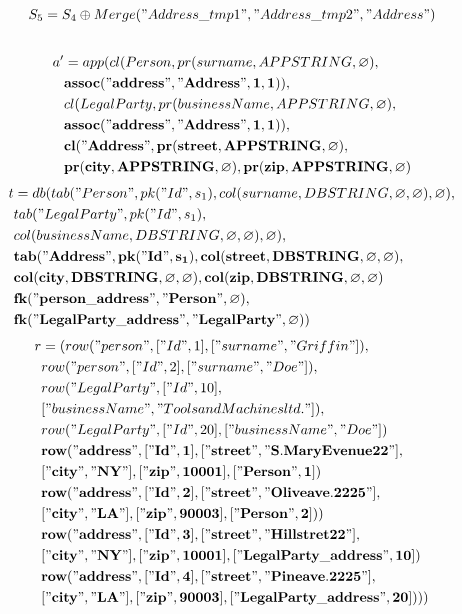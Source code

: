 \documentclass[11pt]{article}
\begin{document}
\newpage
\begin{align*}
	S_5 &= S_4 \oplus Merge("Address\_tmp1", "Address\_tmp2", "Address") \\
& 
\end{align*}
\hline
\begin{align*}
a' &=app(cl(Person, pr(surname, APPSTRING, \varnothing), \\ 
& \mathbf{assoc("address", "Address", 1, 1)}), \\ 
& cl(LegalParty, pr(businessName, APPSTRING, \varnothing),\\
& \mathbf{assoc("address", "Address", 1, 1)}), \\
& \mathbf{cl("Address", pr(street, APPSTRING, \varnothing),} \\
& \mathbf{pr(city, APPSTRING, \varnothing), pr(zip, APPSTRING, \varnothing)}
\end{align*}
\begin{align*}
t &=db(tab("Person", pk("Id", s_1), col(surname, DBSTRING, \varnothing, \varnothing), \varnothing), \\
& tab("LegalParty", pk("Id", s_1),  \\
& col(businessName, DBSTRING, \varnothing, \varnothing), \varnothing), \\
& \mathbf{tab("Address", pk("Id", s_1), col(street, DBSTRING, \varnothing, \varnothing)},\\
& \mathbf{col(city, DBSTRING, \varnothing, \varnothing), col(zip, DBSTRING, \varnothing, \varnothing)} \\
& \mathbf{fk("person\_address", "Person", \varnothing)},\\
& \mathbf{fk("LegalParty\_address", "LegalParty", \varnothing)}) 
\end{align*}
\begin{align*}
r &= (row("person", ["Id", 1], ["surname", "Griffin"]), \\
& row("person", ["Id", 2], ["surname", "Doe"]), \\
& row("LegalParty", ["Id", 10], \\
& ["businessName", "Tools and Machines ltd."]), \\
& row("LegalParty", ["Id", 20], ["businessName", "Doe"])\\
& \mathbf{row("address", ["Id", 1], ["street", "S. Mary Evenue 22"]}, \\ 
& \mathbf{["city", "NY"], ["zip", 10001], ["Person", 1])} \\
& \mathbf{row("address", ["Id", 2], ["street", "Olive ave. 2225"],} \\
& \mathbf{["city", "LA"], ["zip", 90003], ["Person", 2])} )\\
& \mathbf{row("address", ["Id", 3], ["street", "Hill stret 22"], }\\
& \mathbf{["city", "NY"], ["zip", 10001], ["LegalParty\_address", 10]}) \\
& \mathbf{row("address", ["Id", 4], ["street", "Pine ave. 2225"],} \\
& \mathbf{["city", "LA"], ["zip", 90003], ["LegalParty\_address", 20])} ))
\end{align*}
\end{document}
